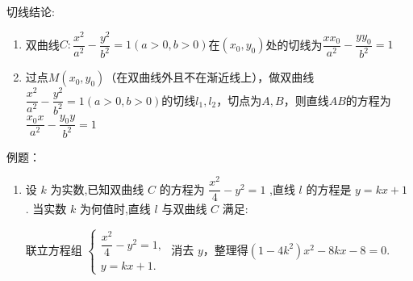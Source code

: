 切线结论:
\begin{enumerate}
    \item 双曲线$C: \dfrac{{x}^{2}}{{a}^{2}} - \dfrac{{y}^{2}}{{b}^{2}} = 1\left( {a > 0, b > 0}\right)$在$(x_0, y_0)$处的切线为$\dfrac{{x}x_0}{{a}^{2}} - \dfrac{{y}y_0}{{b}^{2}} = 1$
    \item 过点$M(x_0, y_0)$（在双曲线外且不在渐近线上），做双曲线$\dfrac{x^2}{a^2}-\dfrac{y^2}{b^2} = 1({a > 0, b > 0})$的切线$l_1, l_2$，切点为$A, B$，则直线$AB$的方程为$\dfrac{x_0x}{a^2}-\dfrac{y_0y}{b^2} = 1$
\end{enumerate}

例题：
\begin{enumerate}
    \item 设 $k$ 为实数,已知双曲线 $C$ 的方程为 $\dfrac{{x}^{2}}{4} - {y}^{2} = 1$ ,直线 $l$ 的方程是 $y = {kx} + 1$ . 当实数 $k$ 为何值时,直线 $l$ 与双曲线 $C$ 满足:
    \begin{jieda}
        联立方程组 $\left\{  \begin{array}{l} \dfrac{{x}^{2}}{4} - {y}^{2} = 1, \\  y = {kx} + 1. \end{array}\right.$ 消去 $y$，整理得$\left( {1 - 4{k}^{2}}\right) {x}^{2} - {8kx} - 8 = 0.$
\end{jieda}
\end{enumerate}
